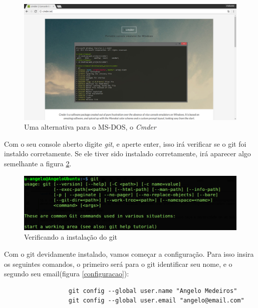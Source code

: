 \documentclass[12pt,openright,oneside,a4paper,english,brazil]{abntex2}
\begin{document}
\begin{figure}[h]
	\caption{\label{cmder}Uma alternativa para o MS-DOS, o \textit{Cmder}}
	\begin{center}
		\includegraphics[width=1\linewidth]{cmder}
	\end{center}
\end{figure}

Com o seu console aberto digite \textit{git}, e aperte enter, isso irá verificar se o git foi instaldo corretamente. Se ele tiver sido instalado corretamente, irá aparecer algo semelhante a figura \ref{terminal}.

\begin{figure}[h]
	\caption{\label{terminal}Verificando a instalação do git}
	\begin{center}
		\includegraphics[width=1\linewidth]{terminal}
	\end{center}
\end{figure}

Com o git devidamente instalado, vamos começar a configuração. Para isso insira os seguintes comandos, o primeiro será para o git identificar seu nome, e o segundo seu email(figura \ref{configuracao}):

	\begin{verbatim}
		          git config --global user.name "Angelo Medeiros"
		          git config --global user.email "angelo@email.com"
	\end{verbatim}
\end{document}

